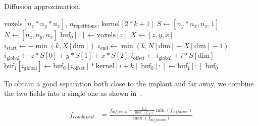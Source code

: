\begin{algorithm}
    \caption{Diffusion approximation.}
    \label{alg:diffusion}
    \begin{algorithmic}
         {voxels$[n_z*n_y*n_x]$, $n_\text{repetitions}$, \newline \indent \indent kernel$[2*k+1]$}
            \State $S \gets [n_y * n_x, n_x, 1]$
            \State $N \gets [n_z, n_y, n_x]$
            \State $\text{buf}_0[:] \gets \text{voxels}[:]$
                        \State $X \gets [z,y,x]$
                        \State $i_\text{start} \gets - \min (k, X[\text{dim}])$
                        \State $i_\text{end} \gets \min (k, N[\text{dim}] - X[\text{dim}] - 1)$
                        \State $i_\text{global} \gets z*S[0] + y*S[1] + x*S[2]$
                            \State $i_\text{offset} \gets i_\text{global} + i*S[\text{dim}]$
                            \State $\text{buf}_1[i_\text{global}] \gets \text{buf}_0[i_\text{offset}] * \text{kernel}[i+k]$
                        \EndFor
                    \EndFor
                    \State $\text{buf}_0[:] \gets \text{buf}_1[:]$
                \EndFor
            \EndFor
            \State \Return $\text{buf}_0$
        \EndFunction
    \end{algorithmic}
\end{algorithm}

To obtain a good separation both close to the implant and far away, we combine the two fields into a
single one as shown in~.

%

\begin{equation}
    \label{eq:field-comb}
    \begin{split}
        f_{combined} &= \frac{f_{diffusion} - \frac{f_{edt}}{\max (f_{edt})} \min (f_{diffusion})}{\max (f_{diffusion})}
    \end{split}
\end{equation}

